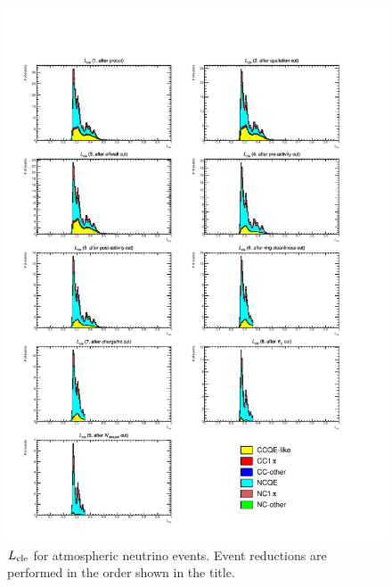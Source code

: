 \begin{figure}[h]
	\centering
	\includegraphics[width=15cm]{PDF/Dist_ATM/Che_50deg_tag_ge1/All/pilike}
	\caption[$L_{\rm cle}$ for atmospheric neutrino events]{
	$L_{\rm cle}$ for atmospheric neutrino events.
	Event reductions are performed in the order shown in the title.
	}\label{ATM_pilike}
\end{figure}

